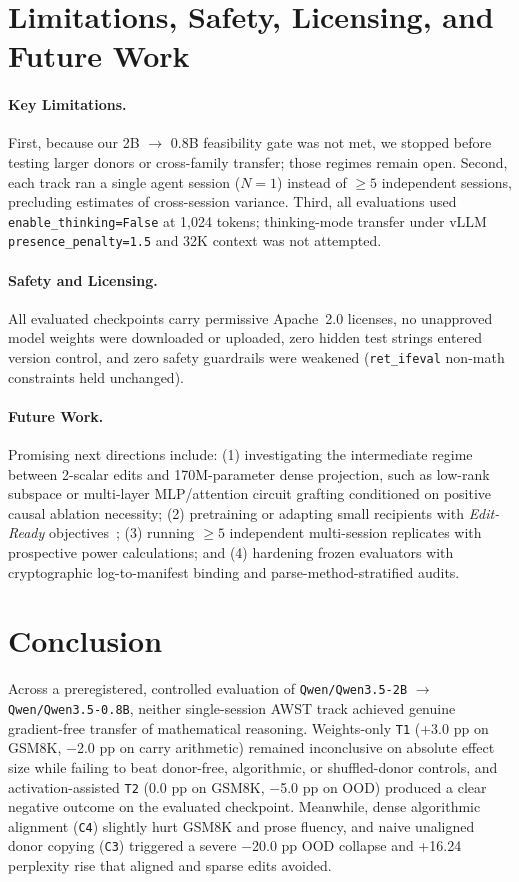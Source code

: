 \documentclass[11pt]{article}
\newcommand{\codepath}[1]{\texttt{\nolinkurl{#1}}}
\begin{document}
\section{Limitations, Safety, Licensing, and Future Work}

\paragraph{Key Limitations.}
First, because our 2B $\rightarrow$ 0.8B feasibility gate was not met, we stopped before testing larger donors or cross-family transfer; those regimes remain open. Second, each track ran a single agent session ($N=1$) instead of $\ge 5$ independent sessions, precluding estimates of cross-session variance. Third, all evaluations used \texttt{enable\_thinking=False} at 1,024 tokens; thinking-mode transfer under vLLM \texttt{presence\_penalty=1.5} and 32K context was not attempted.

\paragraph{Safety and Licensing.}
All evaluated checkpoints carry permissive Apache~2.0 licenses, no unapproved model weights were downloaded or uploaded, zero hidden test strings entered version control, and zero safety guardrails were weakened (\texttt{ret\_ifeval} non-math constraints held unchanged).

\paragraph{Future Work.}
Promising next directions include: (1) investigating the intermediate regime between 2-scalar edits and 170M-parameter dense projection, such as low-rank subspace or multi-layer MLP/attention circuit grafting conditioned on positive causal ablation necessity; (2) pretraining or adapting small recipients with \emph{Edit-Ready} objectives~\cite{ropinski2026editready}; (3) running $\ge 5$ independent multi-session replicates with prospective power calculations; and (4) hardening frozen evaluators with cryptographic log-to-manifest binding and parse-method-stratified audits.

\section{Conclusion}

Across a preregistered, controlled evaluation of \codepath{Qwen/Qwen3.5-2B} $\rightarrow$ \codepath{Qwen/Qwen3.5-0.8B}, neither single-session AWST track achieved genuine gradient-free transfer of mathematical reasoning. Weights-only \texttt{T1} (+3.0 pp on GSM8K, $-$2.0 pp on carry arithmetic) remained inconclusive on absolute effect size while failing to beat donor-free, algorithmic, or shuffled-donor controls, and activation-assisted \texttt{T2} (0.0 pp on GSM8K, $-$5.0 pp on OOD) produced a clear negative outcome on the evaluated checkpoint. Meanwhile, dense algorithmic alignment (\texttt{C4}) slightly hurt GSM8K and prose fluency, and naive unaligned donor copying (\texttt{C3}) triggered a severe $-$20.0 pp OOD collapse and +16.24 perplexity rise that aligned and sparse edits avoided.
\end{document}
